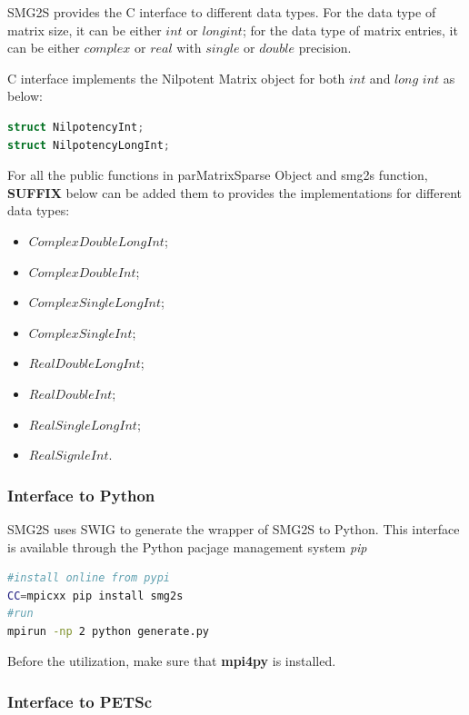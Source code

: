 SMG2S provides the C interface to different data types. For the data type of matrix size, it can be either $int$ or $long int$; for the data type of matrix entries, it can be either $complex$ or $real$ with $single$ or $double$ precision.

C interface implements the Nilpotent Matrix object for both $int$ and $long$ $int$ as below:
\begin{lstlisting}[language=C,frame=single,	basicstyle=\footnotesize]
struct NilpotencyInt;
struct NilpotencyLongInt;
\end{lstlisting}

For all the public functions  in parMatrixSparse Object and smg2s function, \textbf{SUFFIX} below can be added them to provides the implementations for different data types:

\begin{multicols}{2}
	\begin{itemize}
		\item $ComplexDoubleLongInt$;
		\item $ComplexDoubleInt$;
		\item $ComplexSingleLongInt$;
		\item $ComplexSingleInt$;
		\item $RealDoubleLongInt$;
		\item $RealDoubleInt$;
		\item $RealSingleLongInt$;
		\item $RealSignleInt$.
	\end{itemize}
\end{multicols}

\subsubsection{Interface to Python}

SMG2S uses SWIG to generate the wrapper of SMG2S to Python. This interface is available through the Python pacjage management system \textit{pip}

\begin{lstlisting}[language=bash,frame=single]
#install online from pypi
CC=mpicxx pip install smg2s
#run
mpirun -np 2 python generate.py
\end{lstlisting}

Before the utilization, make sure that \textbf{mpi4py} is installed.

\subsubsection{Interface to PETSc}

